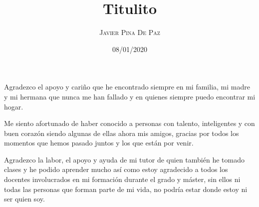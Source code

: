 \documentclass[a4paper,11pt]{book}
\begin{document}
\posttitle{\end{center}}

\title{\Huge \textbf{Titulito}   }
\author{\textsc{Javier Pina De Paz}}
\date{08/01/2020} 

\frontmatter
\maketitle


\begin{dedication}
Agradezco el apoyo y cariño que he encontrado siempre en mi familia, mi madre y mi hermana que nunca me han fallado y en quienes siempre puedo encontrar mi hogar. 


Me siento afortunado de haber conocido a personas con talento, inteligentes y con buen corazón siendo algunas de ellas ahora mis amigos, gracias por todos los momentos que hemos pasado juntos y los que están por venir.


Agradezco la labor, el apoyo y ayuda de mi tutor de quien también he tomado clases y he podido aprender mucho así como estoy agradecido a todos los docentes involucrados en mi formación durante el grado y máster, sin ellos ni todas las personas que forman parte de mi vida, no podría estar donde estoy ni ser quien soy.

\end{dedication}
\end{document}

